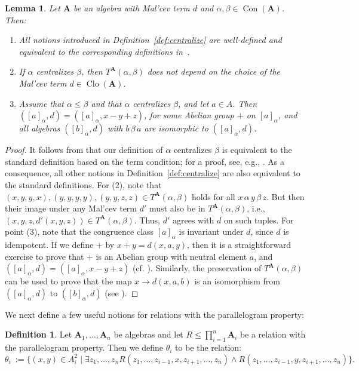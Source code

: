 \documentclass[12pt]{amsart}
\newtheorem{lemma}[theorem]{Lemma}
\theoremstyle{definition}
\theoremstyle{definition}
\newtheorem{definition}[theorem]{Definition}
\newcommand{\alg}[1]{\mathbf{#1}}
\newcommand{\algA}{\alg{A}}
\DeclareMathOperator{\Con}{Con}
\DeclareMathOperator{\Clo}{Clo}
\begin{document}
\begin{lemma} \label{lemma:centerwelldef}
Let $\algA$ be an algebra with Mal'cev term $d$ and $\alpha,\beta \in \Con(\algA)$. Then:
\begin{enumerate}
\item All notions introduced in Definition~\ref{def:centralize} are well-defined and equivalent to the corresponding definitions in~\cite{FreeseMcKenzie}.
\item If $\alpha$ centralizes $\beta$, then $T^\algA(\alpha,\beta)$ does not depend on the choice of the Mal'cev term $d \in \Clo(\algA)$.
\item Assume that $\alpha\leq \beta$ and that $\alpha$ centralizes $\beta$, and let $a\in A$. Then $([a]_\alpha,d) = ([a]_\alpha,x-y+z)$, for some Abelian group $+$ on $[a]_\alpha$, and all algebras $([b]_\alpha,d)$ with $b \, \beta \, a$ are isomorphic to $([a]_\alpha,d)$.
\end{enumerate}
\end{lemma}

\begin{proof}
It follows from \cite[Exercise 6.7]{FreeseMcKenzie} that our definition of $\alpha$ centralizes $\beta$ is equivalent to the standard definition based on the term condition; for a proof, see, e.g., \cite[Lemma 2.4.]{AichingerMayrpqextenstions}. As a consequence, all other notions in Definition~\ref{def:centralize} are also equivalent to the standard definitions.
For (2), note that $(x,y,y,x), (y,y,y,y), (y,y,z,z) \in T^\algA(\alpha,\beta)$ holds for all $x \, \alpha \, y \, \beta \, z$. But then their image under any Mal'cev term $d'$ must also be in $T^\algA(\alpha,\beta)$, i.e., $(x,y,z,d'(x,y,z)) \in T^\algA(\alpha,\beta)$. Thus, $d'$ agrees with $d$ on such tuples. For point (3), note that the congruence class $[a]_\alpha$ is invariant under $d$, since $d$ is idempotent. If we define $+$ by $x+y = d(x,a,y)$, then it is a straightforward exercise to prove that $+$ is an Abelian group with neutral element $a$, and $([a]_\alpha,d) = ([a]_\alpha,x-y+z)$ (cf. \cite[Lemma 5.6]{FreeseMcKenzie}). Similarly, the preservation of $T^\algA(\alpha,\beta)$ can be used to prove that the map $x \to d(x,a,b)$ is an isomorphism from $([a]_\alpha,d)$ to $([b]_\alpha,d)$ (see \cite[Exercise 5.5]{FreeseMcKenzie}).
\end{proof} 

We next define a few useful notions for relations with the parallelogram property:

\begin{definition} \label{def:linkcongruence}
Let $\algA_1,\ldots,\algA_n$ be algebras and let $R \leq \prod_{i=1}^n \alg{A}_i$ be a relation with the parallelogram property. Then we define $\theta_i$ to be the relation:
\[\theta_i\ := \{(x,y) \in A_i^2 \mid  \exists z_1,\ldots, z_n R(z_1,\ldots,z_{i-1}, x, z_{i+1}, \ldots,z_n) \land R(z_1,\ldots,z_{i-1}, y, z_{i+1}, \ldots,z_n)\}.\]
\end{definition}
\end{document}
